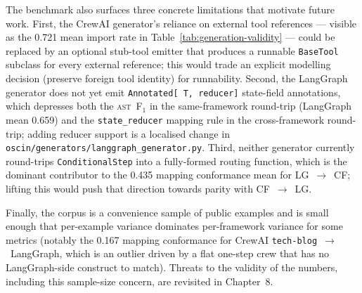 The benchmark also surfaces three concrete limitations that motivate
future work. First, the CrewAI generator's reliance on external tool
references — visible as the 0.721 mean import rate in
Table~\ref{tab:generation-validity} — could be replaced by an
optional stub-tool emitter that produces a runnable
\texttt{BaseTool} subclass for every external reference; this would
trade an explicit modelling decision (preserve foreign tool
identity) for runnability. Second, the LangGraph generator does not
yet emit \texttt{Annotated[\,T,\,reducer]} state-field
annotations, which depresses both the \textsc{ast}~F$_1$ in the
same-framework round-trip (LangGraph mean 0.659) and the
\texttt{state\_reducer} mapping rule in the cross-framework
round-trip; adding reducer support is a localised change in
\texttt{oscin/generators/langgraph\_generator.py}. Third, neither
generator currently round-trips \texttt{ConditionalStep} into a
fully-formed routing function, which is the dominant contributor to
the 0.435 mapping conformance mean for LG~$\to$~CF; lifting this would
push that direction towards parity with CF~$\to$~LG.

Finally, the corpus is a convenience sample of public examples and is
small enough that per-example variance dominates per-framework
variance for some metrics (notably the 0.167 mapping conformance for
CrewAI \texttt{tech-blog}~$\to$~LangGraph, which is an outlier driven
by a flat one-step crew that has no LangGraph-side construct to
match). Threats to the validity of the numbers, including this
sample-size concern, are revisited in Chapter~8.
